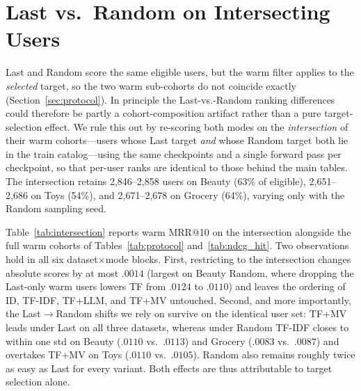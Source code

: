 \documentclass[sigconf,natbib=true,anonymous]{acmart}
\newcommand{\tfidf}{\textsc{TF-IDF}\xspace}
\newcommand{\tfllm}{\textsc{TF+LLM}\xspace}
\newcommand{\tfmv}{\textsc{TF+MV}\xspace}
\begin{document}
\section{Last vs.\ Random on Intersecting Users}
\label{app:intersection}

Last and Random score the same eligible users, but the warm filter applies to the \emph{selected} target, so the two warm sub-cohorts do not coincide exactly (Section~\ref{sec:protocol}).
In principle the Last-vs.-Random ranking differences could therefore be partly a cohort-composition artifact rather than a pure target-selection effect.
We rule this out by re-scoring both modes on the \emph{intersection} of their warm cohorts---users whose Last target \emph{and} whose Random target both lie in the train catalog---using the same checkpoints and a single forward pass per checkpoint, so that per-user ranks are identical to those behind the main tables.
The intersection retains 2{,}846--2{,}858 users on Beauty (63\% of eligible), 2{,}651--2{,}686 on Toys (54\%), and 2{,}671--2{,}678 on Grocery (64\%), varying only with the Random sampling seed.

Table~\ref{tab:intersection} reports warm MRR@10 on the intersection alongside the full warm cohorts of Tables~\ref{tab:protocol} and~\ref{tab:ndcg_hit}.
Two observations hold in all six dataset$\times$mode blocks.
First, restricting to the intersection changes absolute scores by at most $.0014$ (largest on Beauty Random, where dropping the Last-only warm users lowers TF from $.0124$ to $.0110$) and leaves the ordering of ID, \tfidf, \tfllm, and \tfmv untouched.
Second, and more importantly, the Last$\to$Random shifts we rely on survive on the identical user set: \tfmv leads under Last on all three datasets, whereas under Random \tfidf closes to within one std on Beauty ($.0110$ vs.\ $.0113$) and Grocery ($.0083$ vs.\ $.0087$) and overtakes \tfmv on Toys ($.0110$ vs.\ $.0105$).
Random also remains roughly twice as easy as Last for every variant.
Both effects are thus attributable to target selection alone.
\end{document}
